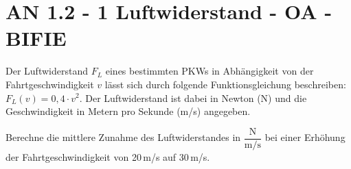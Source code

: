 \section{AN 1.2 - 1 Luftwiderstand - OA - BIFIE}


\begin{beispiel}[AN 1.2]{1} %
Der Luftwiderstand $F_L$ eines bestimmten PKWs in Abhängigkeit von der Fahrtgeschwindigkeit $v$ lässt sich durch folgende Funktionsgleichung beschreiben: $F_L(v) = 0,4 \cdot v^2$. Der Luftwiderstand ist dabei in Newton (N) und die Geschwindigkeit in Metern pro Sekunde (m/s)
angegeben.

\leer

Berechne die mittlere Zunahme des Luftwiderstandes in $\dfrac{\text{N}}{\text{m/s}}$ bei einer Erhöhung der
Fahrtgeschwindigkeit von 20\,m/s auf 30\,m/s.

\end{beispiel}
